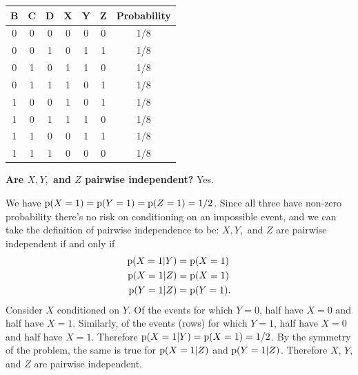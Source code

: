 \documentclass{article}
\begin{document}
\begin{enumerate}[label=(\alph*)]
    \begin{mdframed}

      \begin{tabular}{c|c|c|c|c|c|c}
        B & C & D & X & Y & Z & Probability\\
        \hline
        0 & 0 & 0 & 0 & 0 & 0 & 1/8 \\
        0 & 0 & 1 & 0 & 1 & 1 & 1/8 \\
        0 & 1 & 0 & 1 & 1 & 0 & 1/8 \\
        0 & 1 & 1 & 1 & 0 & 1 & 1/8 \\
        1 & 0 & 0 & 1 & 0 & 1 & 1/8 \\
        1 & 0 & 1 & 1 & 1 & 0 & 1/8 \\
        1 & 1 & 0 & 0 & 1 & 1 & 1/8 \\
        1 & 1 & 1 & 0 & 0 & 0 & 1/8 \\
      \end{tabular}
    \end{mdframed}

    \begin{mdframed}
      \textbf{Are $X, Y,$ and $Z$ pairwise independent?} Yes.

      We have $\operatorname{\text{p}}(X=1) = \operatorname{\text{p}}(Y=1) = \operatorname{\text{p}}(Z=1) = 1/2$. Since all three have
      non-zero probability there's no risk on conditioning on an impossible
      event, and we can take the definition of pairwise independence to be:
      $X, Y,$ and $Z$ are pairwise independent if and only if
      \begin{align*}
        \operatorname{\text{p}}(X=1|Y) &= \operatorname{\text{p}}(X=1)\\
        \operatorname{\text{p}}(X=1|Z) &= \operatorname{\text{p}}(X=1)\\
        \operatorname{\text{p}}(Y=1|Z) &= \operatorname{\text{p}}(Y=1).
      \end{align*}
      Consider $X$ conditioned on $Y$. Of the events for which $Y=0$, half have
      $X=0$ and half have $X=1$. Similarly, of the events (rows) for which
      $Y=1$, half have $X=0$ and half have $X=1$. Therefore
      $\operatorname{\text{p}}(X=1|Y) = \operatorname{\text{p}}(X=1) = 1/2$. By the symmetry of the problem, the same is
      true for $\operatorname{\text{p}}(X=1|Z)$ and $\operatorname{\text{p}}(Y=1|Z)$. Therefore $X$, $Y$, and $Z$ are
      pairwise independent.
    \end{mdframed}


\end{enumerate}
\end{document}

